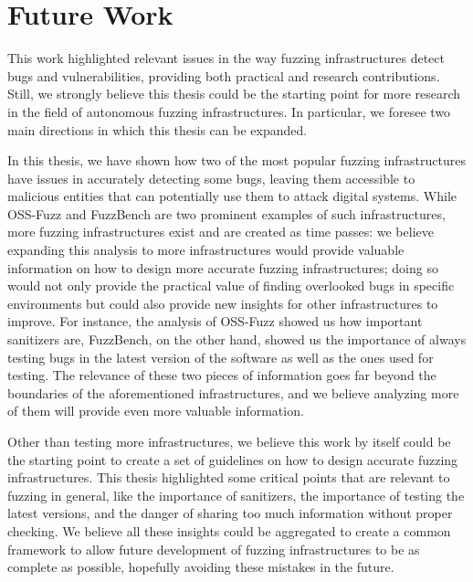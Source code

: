 \newpage
\section{Future Work}

This work highlighted relevant issues in the way fuzzing infrastructures detect bugs and vulnerabilities, providing both practical and research contributions. Still, we strongly believe this thesis could be the starting point for more research in the field of autonomous fuzzing infrastructures. In particular, we foresee two main directions in which this thesis can be expanded.

In this thesis, we have shown how two of the most popular fuzzing infrastructures have issues in accurately detecting some bugs, leaving them accessible to malicious entities that can potentially use them to attack digital systems. While OSS-Fuzz and FuzzBench are two prominent examples of such infrastructures, more fuzzing infrastructures exist and are created as time passes: we believe expanding this analysis to more infrastructures would provide valuable information on how to design more accurate fuzzing infrastructures; doing so would not only provide the practical value of finding overlooked bugs in specific environments but could also provide new insights for other infrastructures to improve. For instance, the analysis of OSS-Fuzz showed us how important sanitizers are, FuzzBench, on the other hand, showed us the importance of always testing bugs in the latest version of the software as well as the ones used for testing. The relevance of these two pieces of information goes far beyond the boundaries of the aforementioned infrastructures, and we believe analyzing more of them will provide even more valuable information.

Other than testing more infrastructures, we believe this work by itself could be the starting point to create a set of guidelines on how to design accurate fuzzing infrastructures. This thesis highlighted some critical points that are relevant to fuzzing in general, like the importance of sanitizers, the importance of testing the latest versions, and the danger of sharing too much information without proper checking. We believe all these insights could be aggregated to create a common framework to allow future development of fuzzing infrastructures to be as complete as possible, hopefully avoiding these mistakes in the future.